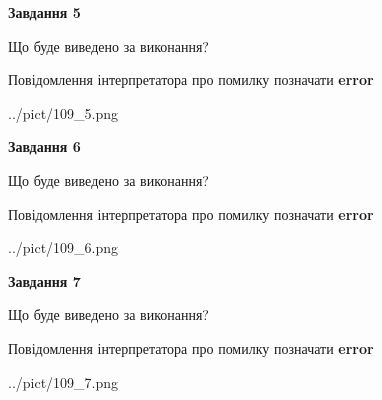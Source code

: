 \documentclass[10pt, ukrainian]{article}
\begin{document}
{\begin {large}
{\begin {center}\textbf{Завдання 5}\end {center}}\par
Що буде виведено за виконання? \par
Повідомлення інтерпретатора про помилку позначати \textbf{error}

\begin{center}
	{../pict/109_5.png}
\end{center}
\newpage

{\begin {center}\textbf{Завдання 6}\end {center}}\par
Що буде виведено за виконання? \par
Повідомлення інтерпретатора про помилку позначати \textbf{error}

\begin{center}
	{../pict/109_6.png}
\end{center}
\newpage

{\begin {center}\textbf{Завдання 7}\end {center}}\par
Що буде виведено за виконання? \par
Повідомлення інтерпретатора про помилку позначати \textbf{error}

\begin{center}
	{../pict/109_7.png}
\end{center}
\newpage

\end {large}}
\end{document}
